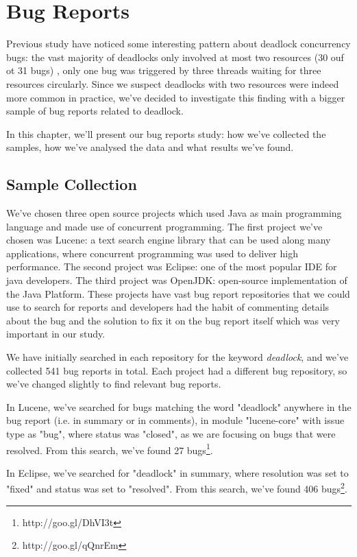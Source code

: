 \chapter{Bug Reports}

Previous study have noticed some interesting pattern about deadlock concurrency bugs: the vast majority of deadlocks only involved at most two resources (30 ouf ot 31 bugs) \cite{lu}, only one bug was triggered by three threads waiting for three resources circularly. Since we suspect deadlocks with two resources were indeed more common in practice, we've decided to investigate this finding with a bigger sample of bug reports related to deadlock.

In this chapter, we'll present our bug reports study: how we've collected the samples, how we've analysed the data and what results we've found.

\section{Sample Collection}

We've chosen three open source projects which used Java as main programming language and made use of concurrent programming. The first project we've chosen was Lucene: a text search engine library that can be used along many applications, where concurrent programming was used to deliver high performance. The second project was Eclipse: one of the most popular IDE for java developers. The third project was OpenJDK: open-source implementation of the Java Platform. These projects have vast bug report repositories that we could use to search for reports and developers had the habit of commenting details about the bug and the solution to fix it on the bug report itself which was very important in our study.

We have initially searched in each repository for the keyword \emph{deadlock}, and we've collected 541 bug reports in total. Each project had a different bug repository, so we've changed slightly to find relevant bug reports.

In Lucene, we've searched for bugs matching the word "deadlock" anywhere in the bug report (i.e. in summary or in comments), in module "lucene-core" with issue type as "bug", where status was "closed", as we are focusing on bugs that were resolved. From this search, we've found 27 bugs\footnote{http://goo.gl/DhVI3t}.

In Eclipse, we've searched for "deadlock" in summary, where resolution was set to "fixed" and status was set to "resolved". From this search, we've found 406 bugs\footnote{http://goo.gl/qQnrEm}.

